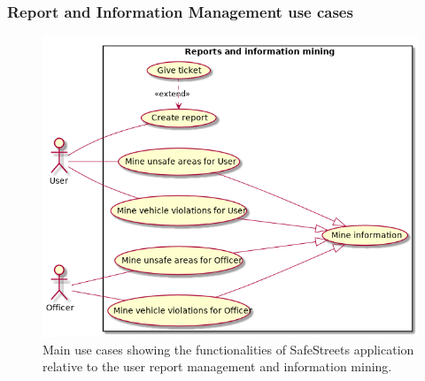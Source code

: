 \subsubsection{Report and Information Management use cases}
\begin{figure}[htp]
	\centering
	\includegraphics[width=\textwidth]{images/useCases/uc_report_and_information_mining.png}
	\caption{Main use cases showing the functionalities of SafeStreets application relative to the user report management and information mining.} 
	\label{fig:reportmanagement} 
\end{figure}


